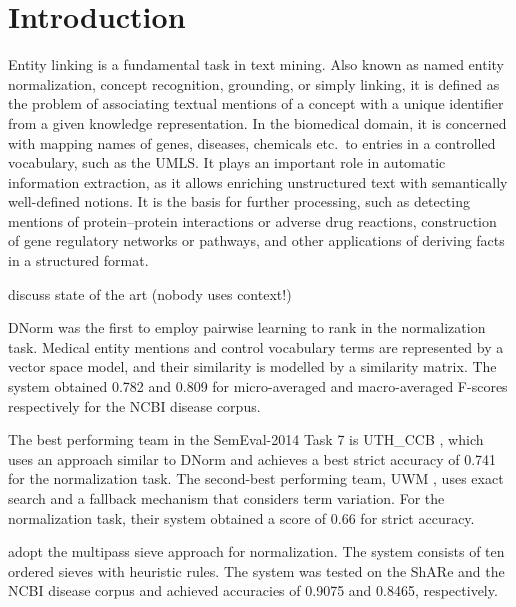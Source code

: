 \documentclass{bioinfo}
\begin{document}
\section{Introduction}

Entity linking is a fundamental task in text mining.
Also known as named entity normalization, concept recognition, grounding, or simply linking, it is defined as the problem of associating textual mentions of a concept with a unique identifier from a given knowledge representation.
In the biomedical domain, it is concerned with mapping names of genes, diseases, chemicals etc.\ to entries in a controlled vocabulary, such as the UMLS.
It plays an important role in automatic information extraction, as it allows enriching unstructured text with semantically well-defined notions.
It is the basis for further processing, such as detecting mentions of protein--protein interactions or adverse drug reactions, construction of gene regulatory networks or pathways, and other applications of deriving facts in a structured format.



discuss state of the art (nobody uses context!)



DNorm \citep{leaman-et-al:2013} was the first to employ pairwise learning to rank in the normalization task.
Medical entity mentions and control vocabulary terms are represented by a vector space model, and their similarity is modelled by a similarity matrix.
The system obtained 0.782 and 0.809 for micro-averaged and macro-averaged F-scores respectively for the NCBI disease corpus.  %

The best performing team in the SemEval-2014 Task 7 is UTH\_CCB \citep{zhang-et-al:2014:SemEval}, which uses an approach similar to DNorm and achieves a best strict accuracy of 0.741 for the normalization task.  %
The second-best performing team, UWM \citep{ghiasvand-kate:2014:SemEval}, uses exact search and a fallback mechanism that considers term variation.
For the normalization task, their system obtained a score of 0.66 for strict accuracy.  %

\cite{dsouza-ng:2015:ACL-IJCNLP} adopt the multipass sieve approach for normalization.
The system consists of ten ordered sieves with heuristic rules.
The system was tested on the ShARe and the NCBI disease corpus and achieved accuracies of 0.9075 and 0.8465, respectively.
\end{document}
